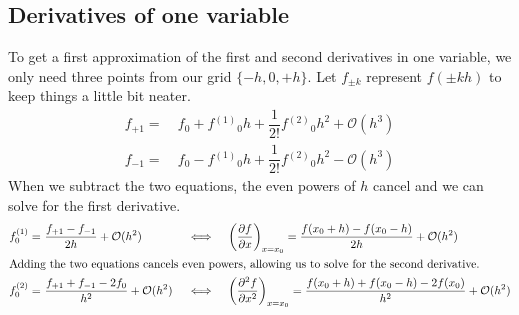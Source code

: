 \documentclass[11pt]{article}
\newcommand{\pt}{\partial}
\newcommand{\fr}[2]{\dfrac{#1}{#2}}
\newcommand{\pr}[1]{\left(#1\right)}
\newcommand{\ord}[1]{\ensuremath{^{(#1)}}}
\newcommand{\bigo}{\ensuremath{\mathcal{O}}}
\begin{document}
\subsection*{Derivatives of one variable}
To get a first approximation of the first and second derivatives in one
variable, we only need three points from our grid $\{-h,0,+h\}$.
Let $f_{\pm k}$ represent $f(\pm kh)$ to keep things a little bit neater.
\begin{align*}
    f_{+1} =&\
    f_0 + f\ord{1}_0 h + \fr{1}{2!}f\ord{2}_0 h^2
    +\bigo(h^3)\\
    f_{-1} =&\
    f_0 - f\ord{1}_0 h + \fr{1}{2!}f\ord{2}_0 h^2
    -\bigo(h^3)
\end{align*}
When we subtract the two equations, the even powers
of $h$ cancel and we can solve for the first derivative.
\begin{align*}
    f\ord{1}_0 =&\ \fr{f_{+1}-f_{-1}}{2h} +\bigo(h^2)
&&\iff
&&
    \pr{\fr{\pt f}{\pt x}}_{x=x_0} = 
    \fr{f(x_0+h)-f(x_0-h)}{2h}+\bigo(h^2)
\\
\intertext{Adding the two equations cancels even powers, allowing us to solve for the
second derivative.}
    f\ord{2}_0 =&\ \fr{f_{+1}+f_{-1}-2f_0}{h^2} +\bigo(h^2)
&&\iff
&&
    \pr{\fr{\pt^2f}{\pt x^2}}_{x=x_0} = 
    \fr{f(x_0+h)+f(x_0-h)-2f(x_0)}{h^2}+\bigo(h^2)
\end{align*}
\end{document}
